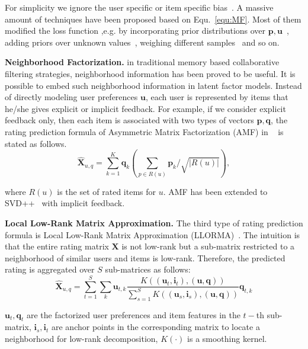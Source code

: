 \documentclass[letterpaper]{article} %
\newcommand{\Rating}{\mathbf{X}}
\begin{document}
For simplicity we ignore the user specific or item specific bias~\cite{Koren2009Matrix}. A massive amount of techniques have been proposed based on Equ.~\ref{equ:MF}. Most of them modified the loss function ,e.g. by incorporating prior distributions over $\mathbf{p},\mathbf{u}$~\cite{salakhutdinov2008probabilistic}, adding priors over unknown values~\cite{Devooght2015Dynamic}, weighing different samples~\cite{Pil'aszy2010Fast} and so on.  

\textbf{Neighborhood Factorization.}  in traditional memory based collaborative filtering strategies, neighborhood information has been proved to be useful. It is possible  to embed such neighborhood information in latent factor models. Instead of directly modeling user preferences $\mathbf{u}$, each user is represented by items that he/she gives explicit or implicit feedback. For example, if we consider explicit feedback only, then each item is associated with two types of vectors $\mathbf{p},\mathbf{q}$, the rating prediction formula of Asymmetric Matrix Factorization (AMF) in ~\cite{Koren2008Factorization} is stated as follows.  
 \begin{equation}\label{equ:AMF}
\hat{\Rating}_{u,q}=\sum_{k=1}^{K} \mathbf{q}_{k} (\sum_{p \in R(u)} \mathbf{p}_k/\sqrt{|R(u)|} ),
\end{equation}

where  $R(u)$ is the set of rated items for $u$. AMF has been extended to SVD++~\cite{Koren2008Factorization} with implicit feedback. 

\textbf{Local Low-Rank Matrix Approximation.} The third type of rating prediction formula is  Local Low-Rank Matrix Approximation (LLORMA)~\cite{Lee2013Local}. The intuition is that the entire rating matrix $\Rating$ is not low-rank but a sub-matrix restricted to a neighborhood of similar users and items is low-rank.  Therefore, the predicted rating is aggregated over $S$ sub-matrices  as follows:
\begin{equation}\label{equ:LLORMA}
\hat{\Rating}_{u,q} = \sum_{t=1}^{S} \sum_k \mathbf{u}_{t, k} \frac{K((\mathbf{u}_t,\mathbf{i}_t),(\mathbf{u},\mathbf{q}))}{\sum_{s=1}^{S} K((\mathbf{u}_s,\mathbf{i}_s),(\mathbf{u},\mathbf{q}))} \mathbf{q}_{t,k}
\end{equation}

$\mathbf{u}_t, \mathbf{q}_t$ are the factorized user preferences and item features in the $t-$th sub-matrix,  $\mathbf{i}_s,\mathbf{i}_t$ are anchor points in the corresponding matrix to locate a neighborhood for low-rank decomposition, $K(\cdot)$ is a smoothing kernel. 
\end{document}
